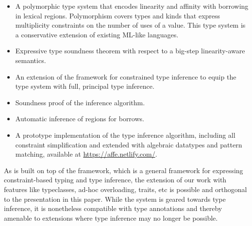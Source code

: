 \begin{itemize}
\item A polymorphic type system that encodes linearity and affinity with
  borrowing in lexical regions. Polymorphism covers types and kinds that
  express multiplicity constraints on the number of uses of a
  value. This type system is a conservative extension of
  existing ML-like languages.
\item Expressive type soundness theorem with respect to a big-step linearity-aware semantics.
\item An extension of the \hmx framework
  \cite{DBLP:journals/tapos/OderskySW99} for constrained type
  inference to equip the type system with full, principal type inference.
\item Soundness proof of the inference algorithm.
\item Automatic inference of regions for borrows.
\item A prototype implementation of the type inference algorithm, including all
  constraint simplification and extended with algebraic datatypes and
  pattern matching,
  available at \url{https://affe.netlify.com/}.
\end{itemize}

As \lang{} is built on top of the \hmx{} framework, which is a general
framework for expressing constraint-based typing and type inference,
the extension of our work with features like typeclasses, ad-hoc overloading,
traits, etc is possible and orthogonal to the presentation in this paper.
While the system is geared towards type inference, it is nonetheless
compatible with type annotations and thereby amenable to extensions
where type inference may no longer be possible.

